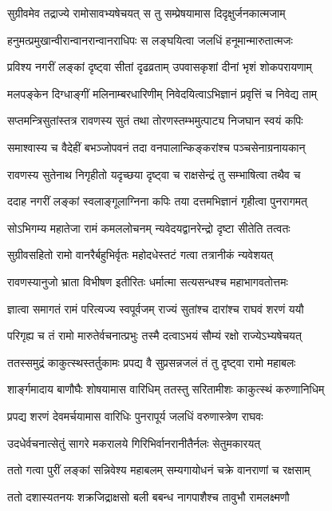 \twolineshloka
{सुग्रीवमेव तद्राज्ये रामोसावभ्यषेचयत्}
{स तु सम्प्रेषयामास दिदृक्षुर्जनकात्मजाम्}%

\twolineshloka
{हनुमत्प्रमुखान्वीरान्वानरान्वानराधिपः}
{स लङ्घयित्वा जलधिं हनूमान्मारुतात्मजः}%

\twolineshloka
{प्रविश्य नगरीं लङ्कां दृष्ट्वा सीतां दृढव्रताम्}
{उपवासकृशां दीनां भृशं शोकपरायणाम्}%

\twolineshloka
{मलपङ्केन दिग्धाङ्गीं मलिनाम्बरधारिणीम्}
{निवेदयित्वाऽभिज्ञानं प्रवृत्तिं च निवेद्य ताम्}%

\twolineshloka
{सप्तमन्त्रिसुतांस्तत्र रावणस्य सुतं तथा}
{तोरणस्तम्भमुत्पाट्य निजघान स्वयं कपिः}%

\twolineshloka
{समाश्वास्य च वैदेहीं बभञ्जोपवनं तदा}
{वनपालान्किङ्करांश्च पञ्चसेनाग्रनायकान्}%

\twolineshloka
{रावणस्य सुतेनाथ निगृहीतो यदृच्छया}
{दृष्ट्वा च राक्षसेन्द्रं तु सम्भाषित्वा तथैव च}%

\twolineshloka
{ददाह नगरीं लङ्कां स्वलाङ्गूलाग्निना कपिः}
{तया दत्तमभिज्ञानं गृहीत्वा पुनरागमत्}%

\twolineshloka
{सोऽभिगम्य महातेजा रामं कमललोचनम्}
{न्यवेदयद्वानरेन्द्रो दृष्टा सीतेति तत्वतः}%

\twolineshloka
{सुग्रीवसहितो रामो वानरैर्बहुभिर्वृतः}
{महोदधेस्तटं गत्वा तत्रानीकं न्यवेशयत्}%

\twolineshloka
{रावणस्यानुजो भ्राता विभीषण इतीरितः}
{धर्मात्मा सत्यसन्धश्च महाभागवतोत्तमः}%

\twolineshloka
{ज्ञात्वा समागतं रामं परित्यज्य स्वपूर्वजम्}
{राज्यं सुतांश्च दारांश्च राघवं शरणं ययौ}%

\twolineshloka
{परिगृह्य च तं रामो मारुतेर्वचनात्प्रभुः}
{तस्मै दत्वाऽभयं सौम्यं रक्षो राज्येऽभ्यषेचयत्}%

\twolineshloka
{ततस्समुद्रं काकुत्स्थस्तर्तुकामः प्रपद्य वै}
{सुप्रसन्नजलं तं तु दृष्ट्वा रामो महाबलः}%

\twolineshloka
{शार्ङ्गमादाय बाणौघैः शोषयामास वारिधिम्}
{ततस्तु सरितामीशः काकुत्स्थं करुणानिधिम्}%

\twolineshloka
{प्रपद्य शरणं देवमर्चयामास वारिधिः}
{पुनरापूर्य जलधिं वरुणास्त्रेण राघवः}%

\twolineshloka
{उदधेर्वचनात्सेतुं सागरे मकरालये}
{गिरिभिर्वानरानीतैर्नलः सेतुमकारयत्}%

\twolineshloka
{ततो गत्वा पुरीं लङ्कां सन्निवेश्य महाबलम्}
{सम्यगायोधनं चक्रे वानराणां च रक्षसाम्}%

\twolineshloka
{ततो दशास्यतनयः शक्रजिद्राक्षसो बली}
{बबन्ध नागपाशैश्च तावुभौ रामलक्ष्मणौ}%

